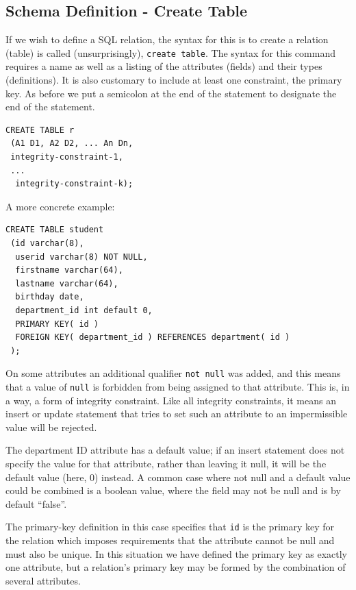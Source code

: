 \subsection*{Schema Definition - Create Table} 
If we wish to define a SQL relation, the syntax for this is to create a relation (table) is called (unsurprisingly), \texttt{create table}. The syntax for this command requires a name as well as a listing of the attributes (fields) and their types (definitions). It is also customary to include at least one constraint, the primary key. As before we put a semicolon at the end of the statement to designate the end of the statement. 


\begin{lstlisting}
CREATE TABLE r
 (A1 D1, A2 D2, ... An Dn,
 integrity-constraint-1,
 ...
  integrity-constraint-k);
\end{lstlisting}

A more concrete example: 

\begin{verbatim}
CREATE TABLE student
 (id varchar(8),
  userid varchar(8) NOT NULL,
  firstname varchar(64),
  lastname varchar(64),
  birthday date,
  department_id int default 0,
  PRIMARY KEY( id )
  FOREIGN KEY( department_id ) REFERENCES department( id )
 );
\end{verbatim}


On some attributes an additional qualifier \texttt{not null} was added, and this means that a value of \texttt{null} is forbidden from being assigned to that attribute. This is, in a way, a form of integrity constraint. Like all integrity constraints, it means an insert or update statement that tries to set such an attribute to an impermissible value will be rejected. 

The department ID attribute has a default value; if an insert statement does not specify the value for that attribute, rather than leaving it null, it will be the default value (here, 0) instead. A common case where not null and a default value could be combined is a boolean value, where the field may not be null and is by default ``false''.

The primary-key definition in this case specifies that \texttt{id} is the primary key for the relation which imposes requirements that the attribute cannot be null and must also be unique. In this situation we have defined the primary key as exactly one attribute, but a relation's primary key may be formed by the combination of several attributes. 
 
